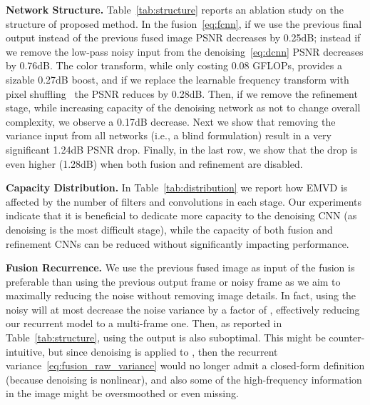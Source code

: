 \documentclass[final]{cvpr}
\begin{document}
    \textbf{Network Structure.} Table~\ref{tab:structure} reports an ablation study on the structure of proposed method. In the fusion~\eqref{eq:fcnn}, if we use the previous final output  instead of the previous fused image  PSNR decreases by 0.25dB; instead if we remove the low-pass noisy input  from the denoising~\eqref{eq:dcnn} PSNR decreases by 0.76dB. The color transform, while only costing 0.08 GFLOPs, provides a sizable 0.27dB boost, and if we replace the learnable frequency transform with pixel shuffling~\cite{shu2016subpx} the PSNR reduces by 0.28dB. Then, if we remove the refinement stage, while increasing capacity of the denoising network as not to change overall complexity, we observe a 0.17dB decrease. Next we show that removing the variance  input from all networks (i.e., a blind formulation) result in a very significant 1.24dB PSNR drop. Finally, in the last row, we show that the drop is even higher (1.28dB) when both fusion and refinement are disabled.
    
    \textbf{Capacity Distribution.} In Table~\ref{tab:distribution} we report how EMVD is affected by the number of filters and convolutions in each stage. Our experiments indicate that it is beneficial to dedicate more capacity to the denoising CNN (as denoising is the most difficult stage), while the capacity of both fusion and refinement CNNs can be reduced without significantly impacting performance.

    \textbf{Fusion Recurrence.} We use the previous fused image  as input of the fusion is preferable than using the previous output frame  or noisy frame  as we aim to maximally reducing the noise without removing image details. In fact, using the noisy  will at most decrease the noise variance by a factor of , effectively reducing our recurrent model to a multi-frame one. Then, as reported in Table~\ref{tab:structure}, using the output  is also suboptimal. This might be counter-intuitive, but since denoising is applied to , then the recurrent variance~\eqref{eq:fusion_raw_variance} would no longer admit a closed-form definition (because denoising is nonlinear), and also some of the high-frequency information in the image might be oversmoothed or even missing.
\end{document}
